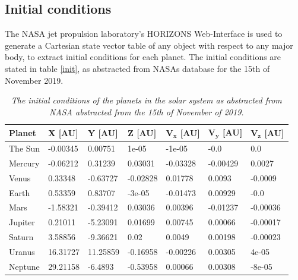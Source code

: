 \documentclass[%
reprint,nofootinbib,
amsmath,amssymb,
aps,
]{revtex4-1}
\begin{document}
\subsection{Initial conditions} \noindent 
The NASA jet propulsion laboratory's HORIZONS Web-Interface is used to generate a Cartesian state vector table of any object with respect to any major body, to extract initial conditions for each planet. The initial conditions are stated in table \ref{init}, as abstracted from NASAs database for the 15th of November 2019.\\ 

\begin{table}[H]
	\captionsetup{width=0.78\textwidth}
	\caption{\textit{The initial conditions of the planets in the solar system as abstracted from NASA abstracted from the 15th of November of 2019.}\label{pdat}}
	\centering
	\begin{tabular}{lllllll}
		\hline
		\multicolumn{1}{l}{ \textbf{Planet} } \hspace{5mm}& \textbf{X [AU]} \hspace{5mm} & \textbf{Y [AU]}  \hspace{5mm} & \textbf{Z [AU]}  \hspace{5mm} & \textbf{V$_\mathbf{x}$ [AU]} \hspace{5mm} & \textbf{V$_\mathbf{y}$ [AU]}  \hspace{5mm} & \textbf{V$_\mathbf{z}$ [AU]} \hspace{5mm} \\ \hline  
		The Sun &	-0.00345 & 0.00751 & 1e-05 & -1e-05 & -0.0 & 0.0 \\
		Mercury &	-0.06212 & 0.31239 & 0.03031 & -0.03328 & -0.00429 & 0.0027 \\
		Venus &	0.33348 & -0.63727 & -0.02828 & 0.01778 & 0.0093 & -0.0009 \\
		Earth &	0.53359 & 0.83707 & -3e-05 & -0.01473 & 0.00929 & -0.0 \\
		Mars &		-1.58321 & -0.39412 & 0.03036 & 0.00396 & -0.01237 & -0.00036 \\
		Jupiter &	0.21011 & -5.23091 & 0.01699 & 0.00745 & 0.00066 & -0.00017 \\
		Saturn &	3.58856 & -9.36621 & 0.02 & 0.0049 & 0.00198 & -0.00023 \\
		Uranus &	16.31727 & 11.25859 & -0.16958 & -0.00226 & 0.00305 & 4e-05 \\
		Neptune &	29.21158 & -6.4893 & -0.53958 & 0.00066 & 0.00308 & -8e-05  \\ \hline 
	\end{tabular}
\end{table}
\end{document}
